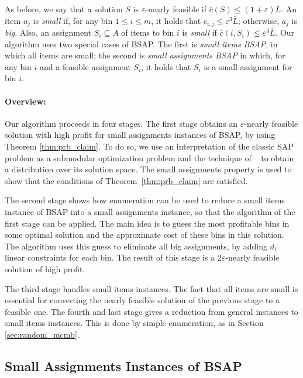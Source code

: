 \documentclass[11pt]{article}
\newcommand{\eps}{\varepsilon}
\newcommand{\bS}{S}
\newcommand{\bL}{\bar{L}}
\newcommand{\bc}{\bar{c}}
\begin{document}
{As before, we say that a solution $S$ is $\eps$-nearly feasible
if $\bc(\bS) \leq (1+\eps) \bL$. An item $a_j$ is \emph{small} if, for
any bin $1 \leq i \leq m$, it holds that $\bc_{i,j} \leq \eps^3 \bL$;
otherwise, $a_j$ is \emph{big}.
Also, an assignment $S_i \subseteq A$ of items to bin $i$
is \emph{small} if
$\bc(i,S_i) \leq \eps^3 \bL$. Our algorithm uses two special cases of
BSAP. The first is
\emph{small items BSAP}, in which all items are small; the second is
 \emph{small assignments BSAP}
in which, for any bin $i$ and a feasible assignment $S_i$, it holds that $S_i$ is a small assignment
for bin $i$.

\paragraph{Overview:}

Our algorithm proceeds in four  stages.
The first stage obtains an $\eps$-nearly feasible solution with high profit
for small assignments instances of BSAP,
 by using Theorem \ref{thm:prb_claim}.
To do so, we use an interpretation of the classic SAP problem as a submodular optimization
problem and the technique of ~\cite{fgms06} to obtain
a distribution over its solution space. The small assignments property is used
 to show that the conditions of Theorem~\ref{thm:prb_claim} are
satisfied.

The second stage shows how enumeration can be used to reduce a small items instance of BSAP into a small assignments instance, so that the
algorithm of the first stage can be applied. The main idea is to guess the most profitable bins in some optimal solution and the approximate
cost of these bins in this solution. The algorithm uses this guess
 to eliminate all big assignments, by adding $d_1$ linear
constraints for each bin. The result of this stage is a $2\eps$-nearly feasible solution of high profit.

The third stage handles small items instances. The fact that all items are small is essential for converting the nearly feasible solution of the
previous stage to a feasible one. The fourth and last stage gives a reduction from general instances to small items instances. This is done by
simple enumeration, as in Section \ref{sec:random_mcmb}.



\subsection{Small Assignments Instances of BSAP}
\label{sec:SABSAP}


}
\end{document}
